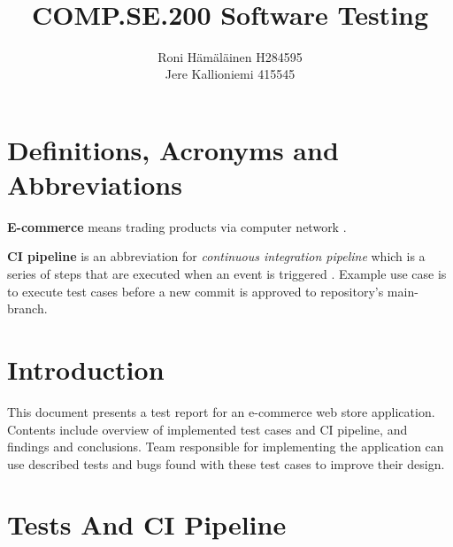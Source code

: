 \documentclass[]{article}
\title{\constTitle\\\constVersion\\COMP.SE.200 Software Testing\\\constRepository}
\author{Roni Hämäläinen H284595\\Jere Kallioniemi 415545}
\begin{document}
\begin{titlingpage}
	\maketitle
\end{titlingpage}

\pagestyle{fancy}

\fancyhead{}
\fancyhead[L]{\constTitle}
\fancyhead[C]{\constVersion}
\fancyhead[R]{\today}
\fancyfoot{}

\tableofcontents

\vspace*{\fill}

\begin{versionhistory}
\end{versionhistory}

\newpage


\section{Definitions, Acronyms and Abbreviations}

\textbf{E-commerce} means trading products via computer network \cite{dictionary_ecommerce}.

\textbf{CI pipeline} is an abbreviation for \textit{continuous integration pipeline} which is a series of steps that are executed when an event is triggered \cite{ci-pipeline}. Example use case is to execute test cases before a new commit is approved to repository's main-branch.

\section{Introduction}

This document presents a test report for an e-commerce web store application.
Contents include overview of implemented test cases and CI pipeline, and findings and conclusions.
Team responsible for implementing the application can use described tests and bugs found with these test cases to improve their design.

\section{Tests And CI Pipeline}
\end{document}
